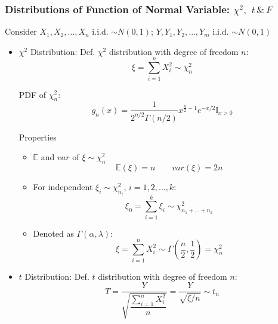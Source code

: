     \subsubsection{Distributions of Function of Normal Variable: $\chi^2,$ $t\,\& \,F$}\label{chi2_t_F_properties}
        Consider $X_1,X_2,\ldots,X_n$ i.i.d. $\sim N(0,1)$; $Y,Y_1,Y_2,\ldots,Y_m$ i.i.d. $\sim N(0,1)$
        \begin{itemize}
            \item $\chi^2$ Distribution: Def. $\chi^2$ distribution with degree of freedom $n$:
            \begin{equation}        
                \xi =\sum_{i=1}^n X_i^2\sim \chi^2_n
            \end{equation}

            PDF of $\chi^2_n$:
            \begin{equation}        
                g_n(x)=\dfrac{1}{2^{n/2}\Gamma(n/2)}x^{\frac{n}{2}-1}e^{-x/2}\mathbb{I}_{x>0}  
            \end{equation}

            Properties
            \begin{itemize}
                \item $\mathbb{E}$ and $var$ of $\xi\sim\chi^2_n$
                \begin{equation}            \mathbb{E}(\xi)=n\qquad var(\xi)=2n\end{equation}
                \item For independent $\xi_i\sim\chi^2_{n_i},\, i=1,2,\ldots,k$:\begin{equation}            
                    \xi_0=\sum_{i=1}^k\xi_i\sim\chi^2_{n_1+\ldots+n_k}\end{equation}
                \item Denoted as $\Gamma(\alpha,\lambda)$: \begin{equation}            \xi=\sum_{i=1}^nX_i^2\sim\Gamma(\frac{n}{2},\frac{1}{2})=\chi^2_n\end{equation}
            \end{itemize}
            \item $t$ Distribution: Def. $t$ distribution with degree of freedom $n$:
            \begin{equation}        
                T=\frac{Y}{\sqrt{\dfrac{\sum_{i=1}^nX_i^2}{n}}}=\frac{Y}{\sqrt{\xi \big/ n}}\sim t_n
            \end{equation}


\end{itemize}
